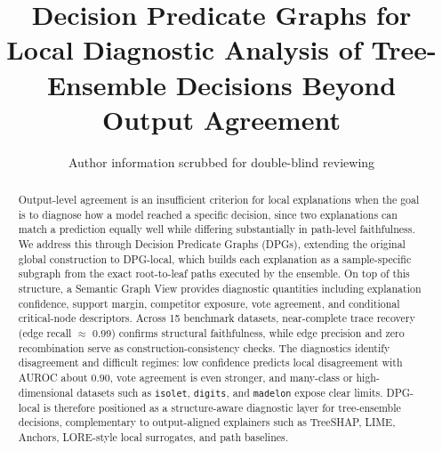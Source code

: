 \documentclass[runningheads]{llncs}
\begin{document}
\title{Decision Predicate Graphs for Local Diagnostic Analysis of Tree-Ensemble Decisions Beyond Output Agreement}



\author{Author information scrubbed for double-blind reviewing}
\institute{}

\maketitle
\begin{abstract} %
Output-level agreement is an insufficient criterion for local explanations when the goal is to diagnose how a model reached a specific decision, since two explanations can match a prediction equally well while differing substantially in path-level faithfulness. We address this through Decision Predicate Graphs (DPGs), extending the original global construction to DPG-local, which builds each explanation as a sample-specific subgraph from the exact root-to-leaf paths executed by the ensemble. On top of this structure, a Semantic Graph View provides diagnostic quantities including explanation confidence, support margin, competitor exposure, vote agreement, and conditional critical-node descriptors. Across 15 benchmark datasets, near-complete trace recovery (edge recall $\approx$ 0.99) confirms structural faithfulness, while edge precision and zero recombination serve as construction-consistency checks. The diagnostics identify disagreement and difficult regimes: low confidence predicts local disagreement with AUROC about $0.90$, vote agreement is even stronger, and many-class or high-dimensional datasets such as \texttt{isolet}, \texttt{digits}, and \texttt{madelon} expose clear limits. DPG-local is therefore positioned as a structure-aware diagnostic layer for tree-ensemble decisions, complementary to output-aligned explainers such as TreeSHAP, LIME, Anchors, LORE-style local surrogates, and path baselines.
\end{abstract}
\end{document}

